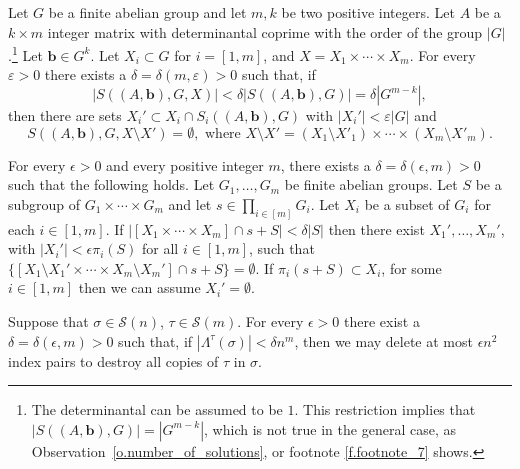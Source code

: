  \begin {theorem} 
 \label {t.rem_lem_ksv13} Let $G$ be a finite abelian group and let $m, k$ be two positive integers. Let $A$ be a $k\times m$ integer matrix with determinantal coprime with the order of the group $|G|$.\footnote {The determinantal can be assumed to be $1$. This restriction implies that $\left |S((A,\mathbf {b}),G)\right |= |G^{m-k}|$, which is not true in the general case, as Observation~\ref {o.number_of_solutions}, or footnote \ref {f.footnote_7} shows.} Let $\mathbf {b}\in G^k$. Let $X_i\subset G$ for $i=[1,m]$, and $X=X_1\times \cdots \times X_m$. For every $\varepsilon >0$ there exists a $\delta =\delta (m,\varepsilon )>0$ such that, if $$\left |S((A,\mathbf {b}),G,X)\right |<\delta \left |S((A,\mathbf {b}),G)\right |=\delta |G^{m-k}|,$$ then there are sets $X_i'\subset X_i\cap S_i((A,\mathbf {b}),G)$ with $|X_i'|<\varepsilon |G|$ and $$S\left ((A,\mathbf {b}),G, X\setminus X'\right )=\emptyset , \text { where } X\setminus X'=(X_1\setminus X'_1)\times \cdots \times (X_m\setminus X'_m).$$ 
 \end {theorem} 
 
 \begin {theorem} 
  \label {t.rem_lem_subgroups} For every $\epsilon >0$ and every positive integer $m$, there exists a $\delta =\delta (\epsilon ,m)>0$ such that the following holds. Let $G_1,\ldots ,G_m$ be finite abelian groups. Let $S$ be a subgroup of $G_1\times \cdots \times G_m$ and let $s\in \prod _{i\in [m]} G_i$. Let $X_i$ be a subset of $G_i$ for each $i\in [1,m]$. If $|\left [X_1\times \cdots \times X_m\right ] \cap s+S|<\delta |S|$ then there exist $X_1',\ldots ,X_m'$, with $|X_i'|<\epsilon \pi _i (S)$ for all $i\in [1,m]$, such that $\{\left [X_1\setminus X_1' \times \cdots \times X_m\setminus X_m'\right ] \cap s+S\}=\emptyset $. If $\pi _i (s+S)\subset X_i$, for some $i\in [1,m]$ then we can assume $X_i'=\emptyset $. 
 \end {theorem} 
 
 \begin {proposition} 
 \label {p.rem_lem_permutations} Suppose that $\sigma \in \mathcal {S}(n)$, $\tau \in \mathcal {S}(m)$. For every $\epsilon >0$ there exist a $\delta =\delta (\epsilon ,m)>0$ such that, if $|\Lambda ^{\tau }(\sigma )|<\delta n^m$, then we may delete at most $\epsilon n^2$ index pairs to destroy all copies of $\tau $ in $\sigma $.
 \end {proposition} 
 
